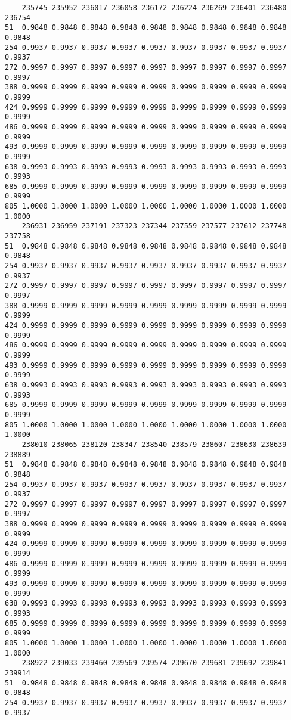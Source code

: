 \documentclass[
]{report}
\begin{document}
\begin{verbatim}
    235745 235952 236017 236058 236172 236224 236269 236401 236480 236754
51  0.9848 0.9848 0.9848 0.9848 0.9848 0.9848 0.9848 0.9848 0.9848 0.9848
254 0.9937 0.9937 0.9937 0.9937 0.9937 0.9937 0.9937 0.9937 0.9937 0.9937
272 0.9997 0.9997 0.9997 0.9997 0.9997 0.9997 0.9997 0.9997 0.9997 0.9997
388 0.9999 0.9999 0.9999 0.9999 0.9999 0.9999 0.9999 0.9999 0.9999 0.9999
424 0.9999 0.9999 0.9999 0.9999 0.9999 0.9999 0.9999 0.9999 0.9999 0.9999
486 0.9999 0.9999 0.9999 0.9999 0.9999 0.9999 0.9999 0.9999 0.9999 0.9999
493 0.9999 0.9999 0.9999 0.9999 0.9999 0.9999 0.9999 0.9999 0.9999 0.9999
638 0.9993 0.9993 0.9993 0.9993 0.9993 0.9993 0.9993 0.9993 0.9993 0.9993
685 0.9999 0.9999 0.9999 0.9999 0.9999 0.9999 0.9999 0.9999 0.9999 0.9999
805 1.0000 1.0000 1.0000 1.0000 1.0000 1.0000 1.0000 1.0000 1.0000 1.0000
    236931 236959 237191 237323 237344 237559 237577 237612 237748 237758
51  0.9848 0.9848 0.9848 0.9848 0.9848 0.9848 0.9848 0.9848 0.9848 0.9848
254 0.9937 0.9937 0.9937 0.9937 0.9937 0.9937 0.9937 0.9937 0.9937 0.9937
272 0.9997 0.9997 0.9997 0.9997 0.9997 0.9997 0.9997 0.9997 0.9997 0.9997
388 0.9999 0.9999 0.9999 0.9999 0.9999 0.9999 0.9999 0.9999 0.9999 0.9999
424 0.9999 0.9999 0.9999 0.9999 0.9999 0.9999 0.9999 0.9999 0.9999 0.9999
486 0.9999 0.9999 0.9999 0.9999 0.9999 0.9999 0.9999 0.9999 0.9999 0.9999
493 0.9999 0.9999 0.9999 0.9999 0.9999 0.9999 0.9999 0.9999 0.9999 0.9999
638 0.9993 0.9993 0.9993 0.9993 0.9993 0.9993 0.9993 0.9993 0.9993 0.9993
685 0.9999 0.9999 0.9999 0.9999 0.9999 0.9999 0.9999 0.9999 0.9999 0.9999
805 1.0000 1.0000 1.0000 1.0000 1.0000 1.0000 1.0000 1.0000 1.0000 1.0000
    238010 238065 238120 238347 238540 238579 238607 238630 238639 238889
51  0.9848 0.9848 0.9848 0.9848 0.9848 0.9848 0.9848 0.9848 0.9848 0.9848
254 0.9937 0.9937 0.9937 0.9937 0.9937 0.9937 0.9937 0.9937 0.9937 0.9937
272 0.9997 0.9997 0.9997 0.9997 0.9997 0.9997 0.9997 0.9997 0.9997 0.9997
388 0.9999 0.9999 0.9999 0.9999 0.9999 0.9999 0.9999 0.9999 0.9999 0.9999
424 0.9999 0.9999 0.9999 0.9999 0.9999 0.9999 0.9999 0.9999 0.9999 0.9999
486 0.9999 0.9999 0.9999 0.9999 0.9999 0.9999 0.9999 0.9999 0.9999 0.9999
493 0.9999 0.9999 0.9999 0.9999 0.9999 0.9999 0.9999 0.9999 0.9999 0.9999
638 0.9993 0.9993 0.9993 0.9993 0.9993 0.9993 0.9993 0.9993 0.9993 0.9993
685 0.9999 0.9999 0.9999 0.9999 0.9999 0.9999 0.9999 0.9999 0.9999 0.9999
805 1.0000 1.0000 1.0000 1.0000 1.0000 1.0000 1.0000 1.0000 1.0000 1.0000
    238922 239033 239460 239569 239574 239670 239681 239692 239841 239914
51  0.9848 0.9848 0.9848 0.9848 0.9848 0.9848 0.9848 0.9848 0.9848 0.9848
254 0.9937 0.9937 0.9937 0.9937 0.9937 0.9937 0.9937 0.9937 0.9937 0.9937

\end{verbatim}
\end{document}
